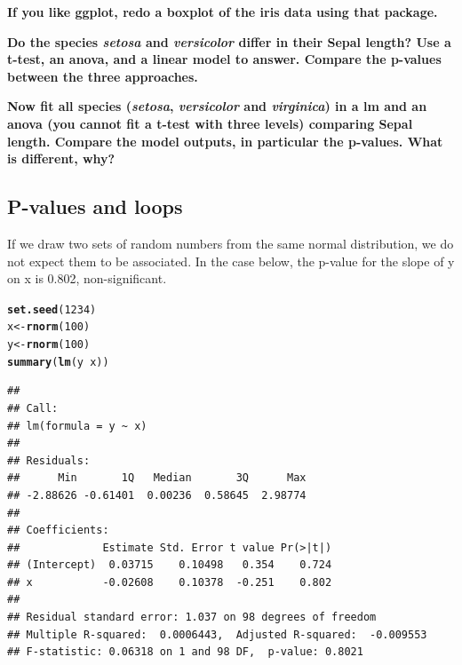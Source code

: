 \documentclass[12pt,a4paper]{scrartcl}\usepackage[]{graphicx}\usepackage[]{color}
\makeatletter
\newcommand{\hlnum}[1]{\textcolor[rgb]{0.686,0.059,0.569}{#1}}%
\newcommand{\hlopt}[1]{\textcolor[rgb]{0,0,0}{#1}}%
\newcommand{\hlstd}[1]{\textcolor[rgb]{0.345,0.345,0.345}{#1}}%
\newcommand{\hlkwb}[1]{\textcolor[rgb]{0.69,0.353,0.396}{#1}}%
\newcommand{\hlkwd}[1]{\textcolor[rgb]{0.737,0.353,0.396}{\textbf{#1}}}%
\newenvironment{kframe}{%
 \def\at@end@of@kframe{}%
 \ifinner\ifhmode%
  \def\at@end@of@kframe{\end{minipage}}%
  \begin{minipage}{\columnwidth}%
 \fi\fi%
 \def\FrameCommand##1{\hskip\@totalleftmargin \hskip-\fboxsep
 \colorbox{shadecolor}{##1}\hskip-\fboxsep
     \hskip-\linewidth \hskip-\@totalleftmargin \hskip\columnwidth}%
 \MakeFramed {\advance\hsize-\width
   \@totalleftmargin\z@ \linewidth\hsize
   \@setminipage}}%
 {\par\unskip\endMakeFramed%
 \at@end@of@kframe}
\newenvironment{knitrout}{}{} %
\makeatother
\begin{document}
\begin{Exercise}[difficulty=1]
\textbf{If you like ggplot, redo a boxplot of the iris data using that package.}
\end{Exercise}

\begin{Exercise}[difficulty=1]
\textbf{Do the species \emph{setosa} and \emph{versicolor} differ in their Sepal length? Use a t-test, an anova, and a linear model to answer. Compare the p-values between the three approaches.}
\end{Exercise}

\begin{Exercise}[difficulty=2]
\textbf{Now fit all species (\emph{setosa}, \emph{versicolor} and  \emph{virginica}) in a lm and an anova (you cannot fit a t-test with three levels) comparing Sepal length. Compare the model outputs, in particular the p-values. What is different, why?}
\end{Exercise}

\subsection{P-values and loops}

If we draw two sets of random numbers from the same normal distribution, we do not expect them to be associated. In the case below, the p-value for the slope of y on x is 0.802, non-significant.
\begin{knitrout}
\color{fgcolor}\begin{kframe}
\begin{alltt}
\hlkwd{set.seed}\hlstd{(}\hlnum{1234}\hlstd{)}
\hlstd{x} \hlkwb{<-} \hlkwd{rnorm}\hlstd{(}\hlnum{100}\hlstd{)}
\hlstd{y} \hlkwb{<-} \hlkwd{rnorm}\hlstd{(}\hlnum{100}\hlstd{)}
\hlkwd{summary}\hlstd{(}\hlkwd{lm}\hlstd{(y}\hlopt{~}\hlstd{x))}
\end{alltt}
\begin{verbatim}
## 
## Call:
## lm(formula = y ~ x)
## 
## Residuals:
##      Min       1Q   Median       3Q      Max 
## -2.88626 -0.61401  0.00236  0.58645  2.98774 
## 
## Coefficients:
##             Estimate Std. Error t value Pr(>|t|)
## (Intercept)  0.03715    0.10498   0.354    0.724
## x           -0.02608    0.10378  -0.251    0.802
## 
## Residual standard error: 1.037 on 98 degrees of freedom
## Multiple R-squared:  0.0006443,	Adjusted R-squared:  -0.009553 
## F-statistic: 0.06318 on 1 and 98 DF,  p-value: 0.8021
\end{verbatim}
\end{kframe}
\end{knitrout}
\end{document}
